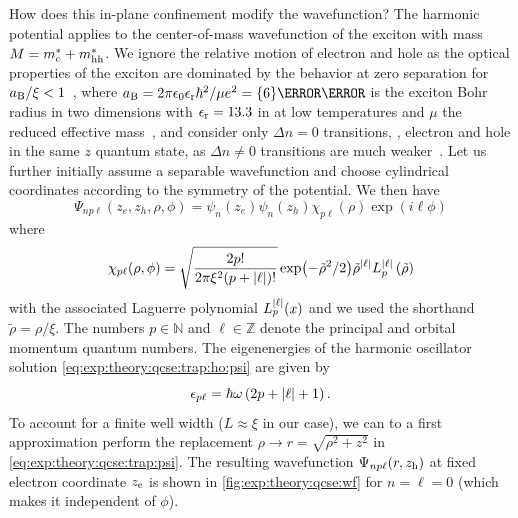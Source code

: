 How does this in-plane confinement modify the wavefunction?
The harmonic potential applies to the center-of-mass wavefunction of the exciton with mass $M = m^\ast_{\mathrm{c}} + m^\ast_{\mathrm{hh}}$.
We ignore the relative motion of electron and hole as the optical properties of the exciton are dominated by the behavior at zero separation for $a_{\mathrm{B}}/\xi < 1$~\cite{Kavokin1994}, where $a_{\mr{B}}=2\pi\eps_0\eps_{\mr{r}}\hbar^2/\mu e^2=\qty{6}{\nano\meter}$ is the exciton Bohr radius in two dimensions with $\epsilon_{\mathrm{r}} = \num{13.3}$ in  at low temperatures and $\mu$ the reduced effective mass~\cite{Olsen2016}, and consider only $\Delta n = 0$ transitions, \ie, electron and hole in the same $z$ quantum state, as $\Delta n\neq 0$ transitions are much weaker~\cite{Davies2009}.
Let us further initially assume a separable wavefunction and choose cylindrical coordinates according to the symmetry of the potential.
We then have
\begin{equation}\label{eq:exp:theory:qcse:trap:psi}
    \Psi_{np\ell}(z_e, z_h, \rho, \phi) = \psi_n(z_e)\psi_n(z_h)\chi_{p\ell}(\rho)\exp(i\ell\phi)
\end{equation}
where~\cite{Karimi2014}
\begin{equation}\label{eq:exp:theory:qcse:trap:ho:psi}
    \chi_{p\ell}(\rho, \phi) = \sqrt{\frac{2p!}{2\pi\xi^2(p + \abs{\ell})!}}\exp(-\tilde{\rho}^2/2)\tilde{\rho}^{\abs{\ell}}L_p^{\abs{\ell}}\left(\tilde{\rho}\right)
\end{equation}
with the associated Laguerre polynomial $L_p^{\abs{\ell}}(x)$ and we used the shorthand $\tilde{\rho} = \rho/\xi$.
The numbers $p\in\mathbb{N}$ and $\ell\in\mathbb{Z}$ denote the principal and orbital momentum quantum numbers.
The eigenenergies of the harmonic oscillator solution \cref{eq:exp:theory:qcse:trap:ho:psi} are given by
\begin{equation}\label{eq:exp:theory:qcse:trap:ho:eps}
    \epsilon_{p\ell} = \hbar\omega\left(2p + \abs{\ell} + 1\right).
\end{equation}
To account for a finite well width ($L\approx\xi$ in our case), we can to a first approximation perform the replacement $\rho\to r = \sqrt{\rho^2 + z^2}$ in \cref{eq:exp:theory:qcse:trap:psi}.
The resulting wavefunction $\Psi_{np\ell}(r, z_{\mathrm{h}})$ at fixed electron coordinate $z_{\mathrm{e}}$ is shown in \cref{fig:exp:theory:qcse:wf} for $n = \ell = 0$ (which makes it independent of $\phi$).

